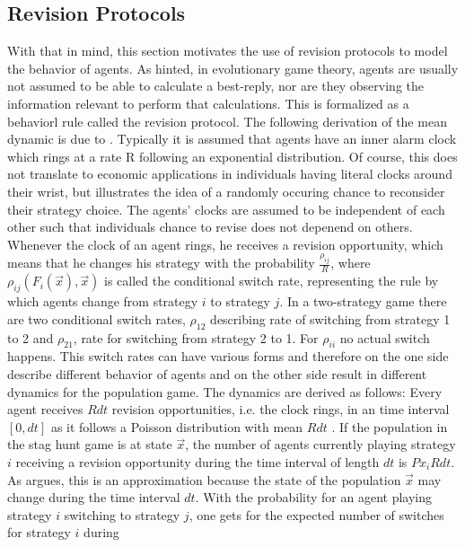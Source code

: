 \documentclass[11pt]{article}
\begin{document}
\subsection{Revision Protocols}
\label{sec:revisionprotocols}
With that in mind, this section motivates the use of revision protocols to
model the behavior of agents.
As hinted, in evolutionary game theory, agents are usually not assumed to be 
able to calculate a best-reply, nor are they observing the information relevant
to perform that calculations. This is formalized as a behaviorl rule called
the revision protocol. The following derivation of the mean dynamic is due to 
\textcite{sandholm_population_2010}. Typically it is 
assumed that agents have an inner alarm clock which rings at a rate R 
following an exponential distribution. Of course, this does not translate 
to economic applications in individuals having literal clocks around their
wrist, but illustrates the idea of a randomly occuring chance to reconsider
their strategy choice.
The agents' clocks are assumed to be independent of each other such that
individuals chance to revise does not depenend on others.
Whenever the clock of an agent rings, he
receives a revision opportunity, which means that he changes his strategy
with the probability $\frac{\rho_{ij}}{R}$, where
$\rho_{ij}(F_i(\vec{x}),\vec{x})$ is called the conditional switch rate,
representing the rule by which agents change from strategy 
$i$ to strategy $j$. 
In a two-strategy game there are two conditional switch rates, $\rho_{12}$ 
describing rate of switching from strategy 1 to 2 and $\rho_{21}$, 
rate for switching from strategy 2 to 1. For $\rho_{ii}$ no actual switch 
happens. This switch rates can have various forms and therefore on the one 
side describe different behavior of agents and on the other side result in 
different dynamics for the population game.
The dynamics are derived as follows:
Every agent receives $R dt$ revision opportunities, i.e. the clock rings, 
in an time interval $[0,dt]$ as it follows a Poisson distribution with
mean $Rdt$ \parencite[123]{sandholm_population_2010}. 
If the population in the stag hunt game is at state $\vec{x}$, the number 
of agents currently playing strategy $i$ receiving a revision opportunity 
during the time interval of length $dt$ is $Px_i R dt$. As 
\textcite{sandholm_population_2010} argues, this is an approximation because
the state of the population $\vec{x}$ may change during the time interval $dt$.
With the probability for an agent playing strategy $i$ switching to strategy
$j$, one gets for the expected number of switches for strategy $i$ during 
\end{document}
